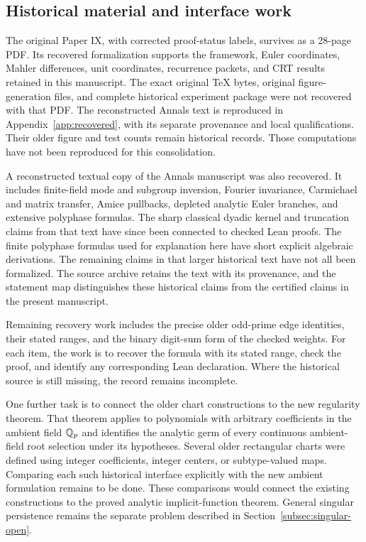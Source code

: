 \subsection{Historical material and interface work}
\label{subsec:historical-scope}

The original Paper IX, with corrected proof-status labels, survives as a
28-page PDF. Its recovered formalization supports the framework, Euler
coordinates, Mahler differences,
unit coordinates, recurrence packets, and CRT results retained in this
manuscript. The exact original TeX bytes, original figure-generation files, and complete
historical experiment package were not recovered with that PDF.
The reconstructed Annals text is reproduced in Appendix~\ref{app:recovered},
with its separate provenance and local qualifications. Their older
figure and test counts remain historical records. Those computations have
not been reproduced for this consolidation.

A reconstructed textual copy of the Annals manuscript was also recovered.
It includes finite-field mode and subgroup inversion, Fourier invariance,
Carmichael and matrix transfer, Amice pullbacks, depleted analytic Euler
branches, and extensive polyphase formulas. The sharp classical dyadic kernel
and truncation claims from that text have since been connected to checked
Lean proofs. The finite polyphase formulas used for explanation here have
short explicit algebraic derivations. The remaining claims in that larger
historical text have not all been formalized.
The source archive retains the text with its provenance, and the statement
map distinguishes these historical claims from the certified claims in the
present manuscript.

Remaining recovery work includes the precise older odd-prime edge identities,
their stated ranges, and the binary digit-sum form of the checked weights.
For each item, the work is to recover the formula with its stated range,
check the proof, and identify any corresponding Lean declaration. Where the
historical source is still missing, the record remains incomplete.

One further task is to connect the older chart constructions to the new
regularity theorem. That theorem applies to polynomials with arbitrary
coefficients in the ambient field $\mathbb Q_p$ and identifies the analytic
germ of every continuous ambient-field root selection under its hypotheses.
Several older rectangular charts were defined using integer coefficients,
integer centers, or subtype-valued maps. Comparing each such historical
interface explicitly with the new ambient formulation remains to be done.
These comparisons would connect the existing constructions to the proved
analytic implicit-function theorem. General singular persistence remains the
separate problem described in Section~\ref{subsec:singular-open}.
